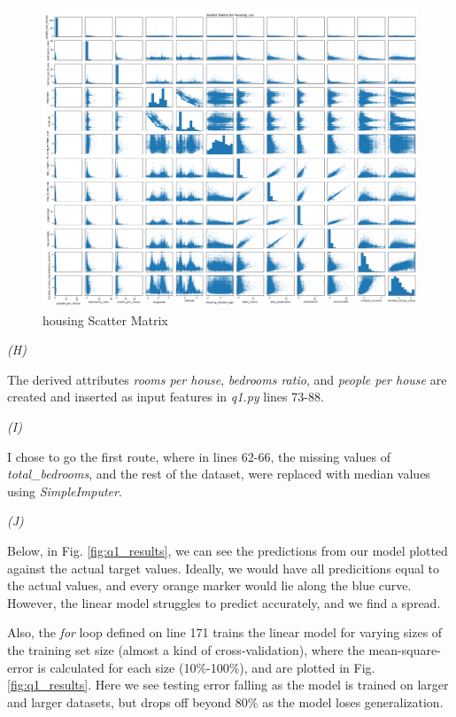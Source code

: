 \documentclass[10pt]{article}
\begin{document}
\begin{figure}[h]
    \includegraphics[width=\textwidth]{../plots/q1/housing_scatter_matrix.png}
    \centering
    \caption{housing Scatter Matrix}
\end{figure}


\clearpage

\smallskip
\textit{(H)}

\smallskip 
The derived attributes \textit{rooms per house}, \textit{bedrooms ratio}, and \textit{people per house} are created and inserted as input features in \emph{q1.py} lines 73-88.

\smallskip
\textit{(I)}

\smallskip 
I chose to go the first route, where in lines 62-66, the missing values of \textit{total\_bedrooms}, and the rest of the dataset, were replaced with median values using \textit{SimpleImputer}.

\smallskip
\textit{(J)}

\smallskip
Below, in Fig. \ref{fig:q1_results}, we can see the predictions from our model plotted against the actual target values. Ideally, we would have all predicitions equal to the actual values, and every orange marker would lie along the blue curve. However, the linear model struggles to predict accurately, and we find a spread. 

Also, the \textit{for} loop defined on line 171 trains the linear model for varying sizes of the training set size (almost a kind of cross-validation), where the mean-square-error is calculated for each size (10\%-100\%), and are plotted in Fig. \ref{fig:q1_results}. Here we see testing error falling as the model is trained on larger and larger datasets, but drops off beyond 80\% as the model loses generalization.
\end{document}
